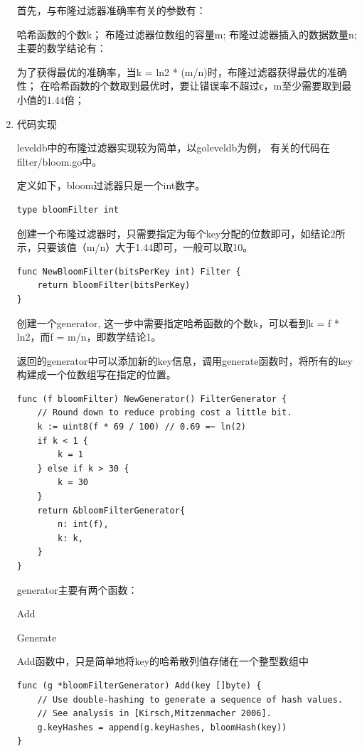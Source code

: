 \begin{enumerate}
首先，与布隆过滤器准确率有关的参数有：

哈希函数的个数k；
布隆过滤器位数组的容量m;
布隆过滤器插入的数据数量n;
主要的数学结论有：

为了获得最优的准确率，当k = ln2 * (m/n)时，布隆过滤器获得最优的准确性；
在哈希函数的个数取到最优时，要让错误率不超过є，m至少需要取到最小值的1.44倍；

			\item 代码实现
			
			leveldb中的布隆过滤器实现较为简单，以goleveldb为例，
			有关的代码在filter/bloom.go中。

定义如下，bloom过滤器只是一个int数字。

\begin{lstlisting}[caption=tFile , label=code_radds_storage_typedef_bloomfilter]
	type bloomFilter int
\end{lstlisting}

创建一个布隆过滤器时，只需要指定为每个key分配的位数即可，如结论2所示，只要该值（m/n）大于1.44即可，一般可以取10。

\begin{lstlisting}[caption=NewBloomFilter , label=code_radds_storage_newbloomfilter]
func NewBloomFilter(bitsPerKey int) Filter {
	return bloomFilter(bitsPerKey)
}
\end{lstlisting}

创建一个generator, 这一步中需要指定哈希函数的个数k，可以看到k = f * ln2，而f = m/n，即数学结论1。

返回的generator中可以添加新的key信息，调用generate函数时，将所有的key构建成一个位数组写在指定的位置。

\begin{lstlisting}[caption=NewGenerator , label=code_radds_storage_NewGenerator]
func (f bloomFilter) NewGenerator() FilterGenerator {
	// Round down to reduce probing cost a little bit.
	k := uint8(f * 69 / 100) // 0.69 =~ ln(2)
	if k < 1 {
		k = 1
	} else if k > 30 {
		k = 30
	}
	return &bloomFilterGenerator{
		n: int(f),
		k: k,
	}
}
\end{lstlisting}

generator主要有两个函数：

Add

Generate

Add函数中，只是简单地将key的哈希散列值存储在一个整型数组中

\begin{lstlisting}[caption=Add , label=code_radds_storage_Add]
func (g *bloomFilterGenerator) Add(key []byte) {
	// Use double-hashing to generate a sequence of hash values.
	// See analysis in [Kirsch,Mitzenmacher 2006].
	g.keyHashes = append(g.keyHashes, bloomHash(key))
}
\end{lstlisting}



\end{enumerate}
